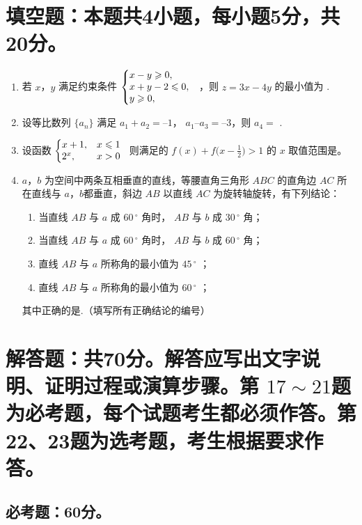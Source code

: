 \documentclass[12pt,twoside,space]{ctexart}
\begin{document}
\section{填空题：本题共4小题，每小题5分，共20分。}
\begin{enumerate}[itemsep=-0.3em,topsep=0pt,resume]%
\item  若 $x$，$y$ 满足约束条件 $\left\{\begin{array}{@{}l}
x-y\geqslant0,\\x+y-2\leqslant0,\\y\geqslant0,
\end{array}\right.$
，则 $z=3x-4y$ 的最小值为 \blank.
\item 设等比数列 $\{a_n\}$ 满足 $a_1+a_2=–1$， $a_1–a_3=–3$，则 $a_4=$ \blank.
\item 设函数 $\biggl\lbrace\begin{array}{@{}ll}
x+1,&x\leqslant1\\2^x,&x>0
\end{array}$ 则满足的 $f(x)+f\big(x-\tfrac{1}{2}\big)>1$ 的 $x$ 取值范围是\blank。
\item $a$，$b$ 为空间中两条互相垂直的直线，等腰直角三角形 $ABC$ 的直角边 $AC$ 所在直线与 $a$，$b$都垂直，斜边 $AB$ 以直线 $AC$ 为旋转轴旋转，有下列结论：
\begin{enumerate}[align=left,labelsep=-0.6em,leftmargin=1.2em,noitemsep,topsep=0pt]
	\item[\ding{172}] 当直线 $AB$ 与 $a$ 成 $60\,^{\circ}$ 角时， $AB$ 与 $b$ 成 $30\,^{\circ}$ 角；
	\item[\ding{173}] 当直线 $AB$ 与 $a$ 成 $60\,^{\circ}$ 角时， $AB$ 与 $b$ 成 $60\,^{\circ}$ 角；
	\item[\ding{174}] 直线 $AB$ 与 $a$ 所称角的最小值为 $45\,^{\circ}$ ；
	\item[\ding{175}] 直线 $AB$ 与 $a$ 所称角的最小值为 $60\,^{\circ}$ ；
\end{enumerate}
其中正确的是\blank.（填写所有正确结论的编号）
\end{enumerate}

\section{解答题：共70分。解答应写出文字说明、证明过程或演算步骤。第 $17\sim21$题为必考题，每个试题考生都必须作答。第22、23题为选考题，考生根据要求作答。}
\subsection{必考题：60分。}
\end{document}
